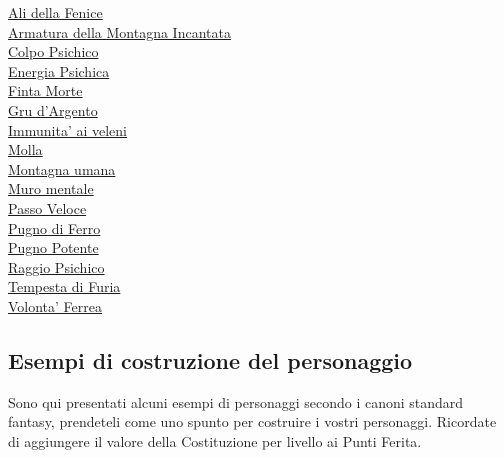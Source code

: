 \begin{multicols}{3}
{\begin{flushleft}
\hyperlink{Ali della Fenice}{Ali della Fenice}\\
\hyperlink{Armatura della Montagna Incantata}{Armatura della Montagna Incantata}\\
\hyperlink{Colpo Psichico}{Colpo Psichico}\\
\hyperlink{Energia Psichica}{Energia Psichica}\\
\hyperlink{Finta Morte}{Finta Morte}\\
\hyperlink{Gru d'Argento}{Gru d'Argento}\\
\hyperlink{Immunita' ai veleni}{Immunita' ai veleni}\\
\hyperlink{Molla}{Molla}\\
\hyperlink{Montagna umana}{Montagna umana}\\
\hyperlink{Muro mentale}{Muro mentale}\\
\hyperlink{abPasso Veloce}{Passo Veloce}\\
\hyperlink{Pugno di Ferro}{Pugno di Ferro}\\
\hyperlink{Pugno Potente}{Pugno Potente}\\
\hyperlink{Raggio Psichico}{Raggio Psichico}\\
\hyperlink{Tempesta di Furia}{Tempesta di Furia}\\
\hyperlink{Volonta' Ferrea}{Volonta' Ferrea}

\end{flushleft}
}

\end{multicols}

\subsection{Esempi di costruzione del personaggio}

Sono qui presentati alcuni esempi di personaggi secondo i canoni standard fantasy, prendeteli come uno spunto per costruire i vostri personaggi. Ricordate di aggiungere il valore della Costituzione per livello ai Punti Ferita.


